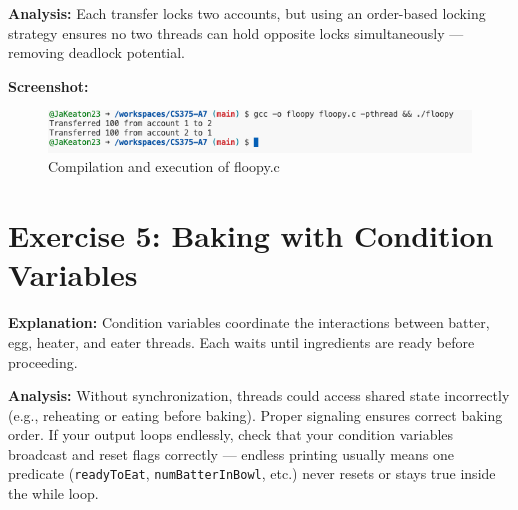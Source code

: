 \documentclass[a4paper,12pt]{article}
\begin{document}
\textbf{Analysis:}  
Each transfer locks two accounts, but using an order-based locking strategy ensures no two threads can hold opposite locks simultaneously — removing deadlock potential.

\textbf{Screenshot:}  
\begin{figure}[h]
\centering
\includegraphics[width=\textwidth]{floppy_output.png}
\caption{Compilation and execution of floopy.c}
\end{figure}

\section{Exercise 5: Baking with Condition Variables}


\textbf{Explanation:}  
Condition variables coordinate the interactions between batter, egg, heater, and eater threads. Each waits until ingredients are ready before proceeding.

\textbf{Analysis:}  
Without synchronization, threads could access shared state incorrectly (e.g., reheating or eating before baking). Proper signaling ensures correct baking order.  
If your output loops endlessly, check that your condition variables broadcast and reset flags correctly — endless printing usually means one predicate (\texttt{readyToEat}, \texttt{numBatterInBowl}, etc.) never resets or stays true inside the while loop.
\end{document}
